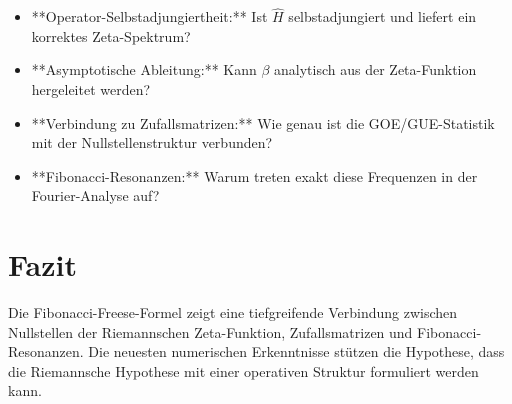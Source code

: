 \documentclass[a4paper,12pt]{article}
\begin{document}
\begin{itemize}
    \item **Operator-Selbstadjungiertheit:** Ist $\hat{H}$ selbstadjungiert und liefert ein korrektes Zeta-Spektrum?
    \item **Asymptotische Ableitung:** Kann $\beta$ analytisch aus der Zeta-Funktion hergeleitet werden?
    \item **Verbindung zu Zufallsmatrizen:** Wie genau ist die GOE/GUE-Statistik mit der Nullstellenstruktur verbunden?
    \item **Fibonacci-Resonanzen:** Warum treten exakt diese Frequenzen in der Fourier-Analyse auf?
\end{itemize}

\section{Fazit}
Die Fibonacci-Freese-Formel zeigt eine tiefgreifende Verbindung zwischen Nullstellen der Riemannschen Zeta-Funktion, Zufallsmatrizen und Fibonacci-Resonanzen. Die neuesten numerischen Erkenntnisse stützen die Hypothese, dass die Riemannsche Hypothese mit einer operativen Struktur formuliert werden kann.
\end{document}
